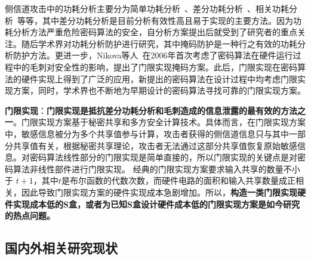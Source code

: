 \documentclass[a4paper,zihao=-4,AutoFakeBold]{ctexart}
\begin{document}



侧信道攻击中的功耗分析主要分为简单功耗分析~\cite{KocherDPA99}、差分功耗分析~\cite{KocherDPA99}、相关功耗分析~\cite{CPA04}等等，其中差分功耗分析是目前分析有效性高且易于实现的主要方法。因为功耗分析方法严重危险密码算法的安全，自分析方案提出后就受到了研究者的重点关注。随后学术界对功耗分析防护进行研究，其中掩码防护是一种行之有效的功耗分析防护方法。更进一步，Nikova等人~\cite{Nikova06TI}在2006年首次考虑了密码算法在硬件运行过程中的毛刺对安全性的影响，提出了门限实现掩码方案。此后，门限实现在密码算法的硬件实现上得到了广泛的应用，新提出的密码算法在设计过程中均考虑门限实现方案，同时，学术界也不断地为早期设计的密码算法寻找可靠的门限实现方案。

\textbf{门限实现}：\textbf{门限实现是抵抗差分功耗分析和毛刺造成的信息泄露的最有效的方法之一}。门限实现方案基于秘密共享和多方安全计算技术。具体而言，在门限实现方案中，敏感信息被分为多个共享值参与计算，攻击者获得的侧信道信息只与其中一部分共享值有关，根据秘密共享理论，攻击者无法通过这部分共享值恢复原始敏感信息。对密码算法线性部分的门限实现是简单直接的，所以门限实现的关键点是对密码算法非线性部件进行门限实现。
经典的门限实现方案要求输入共享的数量不小于 $t+1$，其中$t$是布尔函数的代数次数，而硬件电路的面积和输入共享数量成正相关，因此导致门限实现方案的硬件实现成本急剧增加。所以，\textbf{构造一类门限实现硬件实现成本低的S盒，或者为已知S盒设计硬件成本低的门限实现方案是如今研究的热点问题。}


\subsection{国内外相关研究现状}
\end{document}

